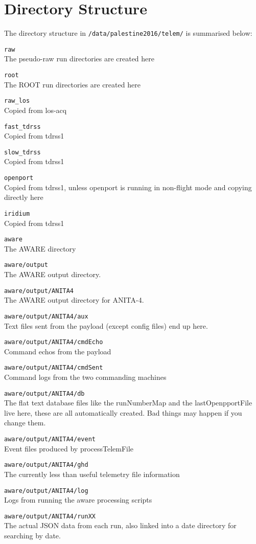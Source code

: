 \documentclass{article}
\begin{document}
\section{Directory Structure}
The directory structure in {\tt /data/palestine2016/telem/} is summarised below:
\begin{description}
\item{{\tt raw}} \\The pseudo-raw run directories are created here
\item{{\tt root}} \\The ROOT run directories are created here
\item{{\tt raw\_los}} \\Copied from los-acq
\item{{\tt fast\_tdrss}} \\Copied from tdrss1
\item{{\tt slow\_tdrss}} \\Copied from tdrss1
\item{{\tt openport}} \\Copied from tdrss1, unless openport is running in non-flight mode and copying directly here
\item{{\tt iridium}} \\Copied from tdrss1
\item{{\tt aware}} \\The AWARE directory
\item{{\tt aware/output}} \\The AWARE output directory.
\item{{\tt aware/output/ANITA4}} \\The AWARE output directory for ANITA-4.
\item{{\tt aware/output/ANITA4/aux}} \\Text files sent from the payload (except config files) end up here.
\item{{\tt aware/output/ANITA4/cmdEcho}}\\ Command echos from the payload
\item{{\tt aware/output/ANITA4/cmdSent}} \\Command logs from the two commanding machines
\item{{\tt aware/output/ANITA4/db}} \\The flat text database files like the runNumberMap and the lastOpenpportFile live here, these are all automatically created. Bad things may happen if you change them.
\item{{\tt aware/output/ANITA4/event}} \\Event files produced by processTelemFile
\item{{\tt aware/output/ANITA4/ghd}} \\The currently less than useful telemetry file information
\item{{\tt aware/output/ANITA4/log}} \\Logs from running the aware processing scripts
\item{{\tt aware/output/ANITA4/runXX}} \\The actual JSON data from each run, also linked into a date directory for searching by date.
\end{description}
\end{document}
